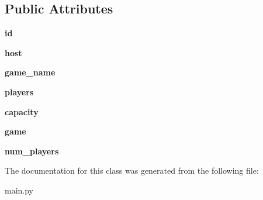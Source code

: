 \subsection*{Public Attributes}
\begin{DoxyCompactItemize}
\item 
\hypertarget{classcards-with-friends_1_1main_1_1_room_aadc70adeea107495c7da140785db1b71}{{\bfseries id}}\label{classcards-with-friends_1_1main_1_1_room_aadc70adeea107495c7da140785db1b71}

\item 
\hypertarget{classcards-with-friends_1_1main_1_1_room_aab5bf3c72e42063b242b618c7dd807c9}{{\bfseries host}}\label{classcards-with-friends_1_1main_1_1_room_aab5bf3c72e42063b242b618c7dd807c9}

\item 
\hypertarget{classcards-with-friends_1_1main_1_1_room_a6c2c33b8796f1ea5d77d23e9441f343e}{{\bfseries game\-\_\-name}}\label{classcards-with-friends_1_1main_1_1_room_a6c2c33b8796f1ea5d77d23e9441f343e}

\item 
\hypertarget{classcards-with-friends_1_1main_1_1_room_a5fa1116257748fdde1d708ba7085013c}{{\bfseries players}}\label{classcards-with-friends_1_1main_1_1_room_a5fa1116257748fdde1d708ba7085013c}

\item 
\hypertarget{classcards-with-friends_1_1main_1_1_room_a5eb31d2acf2fcb13b398fe1393363d3d}{{\bfseries capacity}}\label{classcards-with-friends_1_1main_1_1_room_a5eb31d2acf2fcb13b398fe1393363d3d}

\item 
\hypertarget{classcards-with-friends_1_1main_1_1_room_a669025fad526c19ad37ef40cdb87e0de}{{\bfseries game}}\label{classcards-with-friends_1_1main_1_1_room_a669025fad526c19ad37ef40cdb87e0de}

\item 
\hypertarget{classcards-with-friends_1_1main_1_1_room_aa7b104fd42bbe4b7879fafcaa3c5cc67}{{\bfseries num\-\_\-players}}\label{classcards-with-friends_1_1main_1_1_room_aa7b104fd42bbe4b7879fafcaa3c5cc67}

\end{DoxyCompactItemize}


The documentation for this class was generated from the following file\-:\begin{DoxyCompactItemize}
\item 
main.\-py\end{DoxyCompactItemize}
